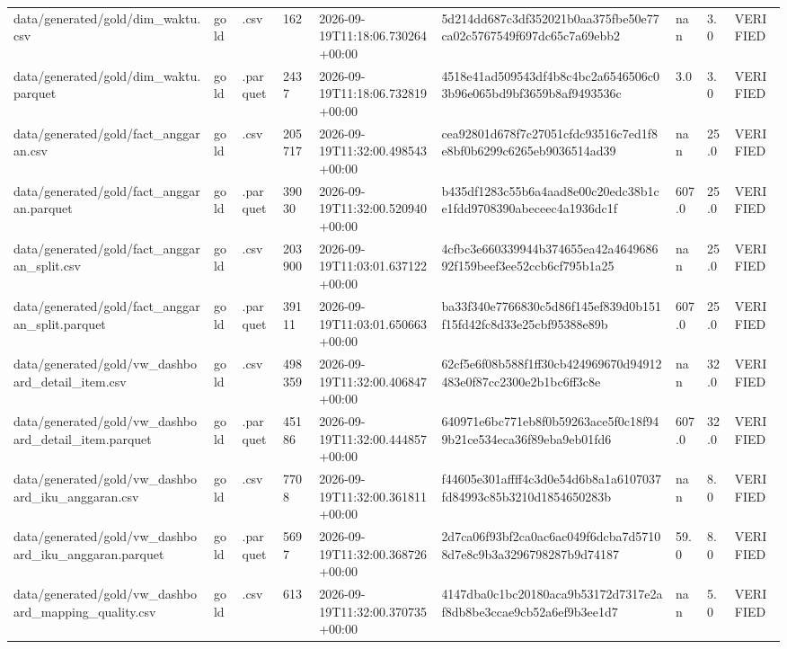 \begin{longtable}{lllllllll}
data/generated/gold/dim_waktu.csv & gold & .csv & 162 & 2026-09-19T11:18:06.730264+00:00 & 5d214dd687c3df352021b0aa375fbe50e77ca02c5767549f697dc65c7a69ebb2 & nan & 3.0 & VERIFIED \\
data/generated/gold/dim_waktu.parquet & gold & .parquet & 2437 & 2026-09-19T11:18:06.732819+00:00 & 4518e41ad509543df4b8c4bc2a6546506c03b96e065bd9bf3659b8af9493536c & 3.0 & 3.0 & VERIFIED \\
data/generated/gold/fact_anggaran.csv & gold & .csv & 205717 & 2026-09-19T11:32:00.498543+00:00 & cea92801d678f7c27051cfdc93516c7ed1f8e8bf0b6299c6265eb9036514ad39 & nan & 25.0 & VERIFIED \\
data/generated/gold/fact_anggaran.parquet & gold & .parquet & 39030 & 2026-09-19T11:32:00.520940+00:00 & b435df1283c55b6a4aad8e00c20edc38b1ce1fdd9708390abeceec4a1936dc1f & 607.0 & 25.0 & VERIFIED \\
data/generated/gold/fact_anggaran_split.csv & gold & .csv & 203900 & 2026-09-19T11:03:01.637122+00:00 & 4cfbc3e660339944b374655ea42a464968692f159beef3ee52ccb6cf795b1a25 & nan & 25.0 & VERIFIED \\
data/generated/gold/fact_anggaran_split.parquet & gold & .parquet & 39111 & 2026-09-19T11:03:01.650663+00:00 & ba33f340e7766830c5d86f145ef839d0b151f15fd42fc8d33e25cbf95388e89b & 607.0 & 25.0 & VERIFIED \\
data/generated/gold/vw_dashboard_detail_item.csv & gold & .csv & 498359 & 2026-09-19T11:32:00.406847+00:00 & 62cf5e6f08b588f1ff30cb424969670d94912483e0f87cc2300e2b1bc6ff3c8e & nan & 32.0 & VERIFIED \\
data/generated/gold/vw_dashboard_detail_item.parquet & gold & .parquet & 45186 & 2026-09-19T11:32:00.444857+00:00 & 640971e6bc771eb8f0b59263ace5f0c18f949b21ce534eca36f89eba9eb01fd6 & 607.0 & 32.0 & VERIFIED \\
data/generated/gold/vw_dashboard_iku_anggaran.csv & gold & .csv & 7708 & 2026-09-19T11:32:00.361811+00:00 & f44605e301affff4c3d0e54d6b8a1a6107037fd84993c85b3210d1854650283b & nan & 8.0 & VERIFIED \\
data/generated/gold/vw_dashboard_iku_anggaran.parquet & gold & .parquet & 5697 & 2026-09-19T11:32:00.368726+00:00 & 2d7ca06f93bf2ca0ac6ac049f6dcba7d57108d7e8c9b3a3296798287b9d74187 & 59.0 & 8.0 & VERIFIED \\
data/generated/gold/vw_dashboard_mapping_quality.csv & gold & .csv & 613 & 2026-09-19T11:32:00.370735+00:00 & 4147dba0c1bc20180aca9b53172d7317e2af8db8be3ccae9cb52a6ef9b3ee1d7 & nan & 5.0 & VERIFIED \\

\end{longtable}
